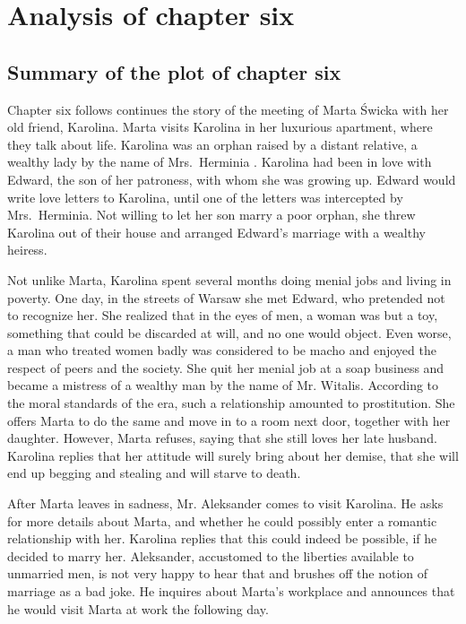 \section{Analysis of chapter six}

\subsection{Summary of the plot of chapter six}

Chapter six follows continues the story of the meeting of Marta Świcka with her old friend, Karolina.
Marta visits Karolina in her luxurious apartment, where they talk about life.
Karolina was an orphan raised by a distant relative, a wealthy lady by the name of Mrs.\ Herminia%
.
Karolina had been in love with Edward, the son of her patroness, with whom she was growing up.
Edward would write love letters to Karolina, until one of the letters was intercepted by Mrs.\ Herminia.
Not willing to let her son marry a poor orphan, she threw Karolina out of their house and arranged Edward's marriage with a wealthy heiress.

Not unlike Marta, Karolina spent several months doing menial jobs and living in poverty.
One day, in the streets of Warsaw she met Edward, who pretended not to recognize her.
She realized that in the eyes of men, a woman was but a toy, something that could be discarded at will, and no one would object.
Even worse, a man who treated women badly was considered to be macho and enjoyed the respect of peers and the society.
She quit her menial job at a soap business and became a mistress of a wealthy man by the name of Mr. Witalis.
According to the moral standards of the era, such a relationship amounted to prostitution.
She offers Marta to do the same and move in to a room next door, together with her daughter.
However, Marta refuses, saying that she still loves her late husband.
Karolina replies that her attitude will surely bring about her demise, that she will end up begging and stealing and will starve to death.

After Marta leaves in sadness, Mr. Aleksander comes to visit Karolina.
He asks for more details about Marta, and whether he could possibly enter a romantic relationship with her.
Karolina replies that this could indeed be possible, if he decided to marry her.
Aleksander, accustomed to the liberties available to unmarried men, is not very happy to hear that and brushes off the notion of marriage as a bad joke.
He inquires about Marta's workplace and announces that he would visit Marta at work the following day.